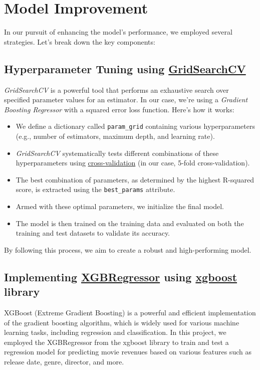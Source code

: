 \documentclass[conference]{IEEEtran}
\begin{document}
\section{Model Improvement}
    In our pursuit of enhancing the model's performance, we employed several strategies. Let's break down the key components:

    \subsection{Hyperparameter Tuning using \href{https://scikit-learn.org/stable/modules/generated/sklearn.model_selection.GridSearchCV.html}{GridSearchCV}}

     \textit{GridSearchCV} is a powerful tool that performs an exhaustive search over specified parameter values for an estimator. In our case, we're using a \textit{Gradient Boosting Regressor} with a squared error loss function. Here's how it works:

    \begin{itemize}
        \item We define a dictionary called \texttt{param\_grid} containing various hyperparameters (e.g., number of estimators, maximum depth, and learning rate).
        \item \textit{GridSearchCV} systematically tests different combinations of these hyperparameters using \href{https://scikit-learn.org/stable/modules/cross_validation.html}{cross-validation} (in our case, 5-fold cross-validation).
        \item The best combination of parameters, as determined by the highest R-squared score, is extracted using the \texttt{best\_params} attribute.
        \item Armed with these optimal parameters, we initialize the final model.
        \item The model is then trained on the training data and evaluated on both the training and test datasets to validate its accuracy.
    \end{itemize}

    By following this process, we aim to create a robust and high-performing model.

    \subsection{Implementing \href{https://xgboost.readthedocs.io/en/latest/python/python_api.html}{XGBRegressor} using \href{https://xgboost.readthedocs.io/en/stable/}{xgboost} library}
    XGBoost (Extreme Gradient Boosting) is a powerful and efficient implementation of the gradient boosting algorithm, which is widely used for various machine learning tasks, including regression and classification. In this project, we employed the XGBRegressor from the xgboost library to train and test a regression model for predicting movie revenues based on various features such as release date, genre, director, and more.
\end{document}
